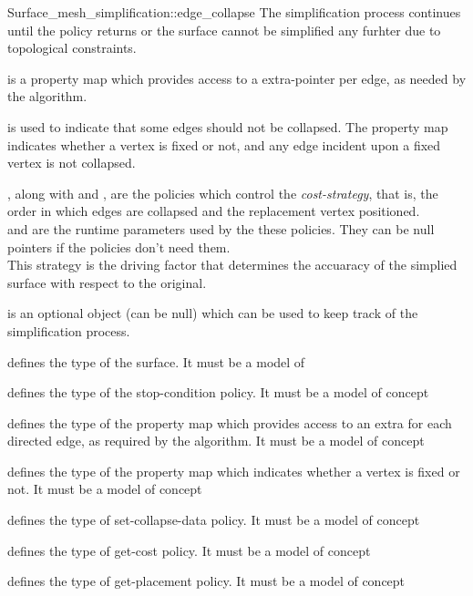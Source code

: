 \begin{ccRefFunction}{Surface_mesh_simplification::edge_collapse}
The simplification process continues until the  policy returns 
or the surface cannot be simplified any furhter due to topological constraints.

 is a property map which provides access
to a  extra-pointer per edge, as needed by the algorithm.

 is used to indicate that some edges should not be
collapsed. The property map indicates whether a vertex is fixed or not,
and any edge incident upon a fixed vertex is not collapsed.

, along with  and ,
are the policies which control the {\em cost-strategy}, that is, 
the order in which edges are collapsed and the replacement vertex positioned.\\
 and  are the runtime 
parameters used by the these policies. They can be null pointers
if the policies don't need them.\\
This strategy is the driving factor that determines the accuaracy of the
simplied surface with respect to the original.

 is an optional object (can be null) which can be used
to keep track of the simplification process.


 defines the type of the surface.
It must be a model of 

 defines the type of the stop-condition policy.
It must be a model of  concept

 defines the type of the property map which 
provides access to an extra  for each directed edge,
as required by the algorithm.
It must be a model of  concept

 defines the type of the property map which 
indicates whether a vertex is fixed or not.
It must be a model of  concept

 defines the type of set-collapse-data policy.
It must be a model of  concept

 defines the type of get-cost policy.
It must be a model of  concept

 defines the type of get-placement policy.
It must be a model of  concept


\end{ccRefFunction}
